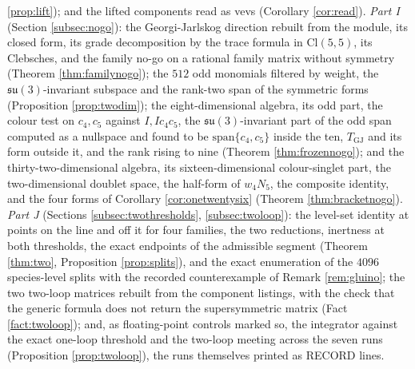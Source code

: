\documentclass[11pt]{article}
\theoremstyle{definition}
\newcommand{\Cl}{\mathrm{Cl}}
\newcommand{\su}{\mathfrak{su}}
\begin{document}
\ref{prop:lift}); and the lifted components read as vevs (Corollary \ref{cor:read}). \emph{Part I} (Section \ref{subsec:nogo}): the Georgi-Jarlskog direction rebuilt from the module, its closed form, its grade decomposition by the trace formula in $\Cl(5,5)$, its Clebsches, and the family no-go on a rational family matrix without symmetry (Theorem \ref{thm:familynogo}); the $512$ odd monomials filtered by weight, the $\su(3)$-invariant subspace and the rank-two span of the symmetric forms (Proposition \ref{prop:twodim}); the eight-dimensional algebra, its odd part, the colour test on $c_{4}, c_{5}$ against $I, Ic_{4}c_{5}$, the $\su(3)$-invariant part of the odd span computed as a nullspace and found to be $\mathrm{span}\{c_{4}, c_{5}\}$ inside the ten, $T_{\mathrm{GJ}}$ and its form outside it, and the rank rising to nine (Theorem \ref{thm:frozennogo}); and the thirty-two-dimensional algebra, its sixteen-dimensional colour-singlet part, the two-dimensional doublet space, the half-form of $w_{4}N_{5}$, the composite identity, and the four forms of Corollary \ref{cor:onetwentysix} (Theorem \ref{thm:bracketnogo}). \emph{Part J} (Sections \ref{subsec:twothresholds}, \ref{subsec:twoloop}): the level-set identity at points on the line and off it for four families, the two reductions, inertness at both thresholds, the exact endpoints of the admissible segment (Theorem \ref{thm:two}, Proposition \ref{prop:splits}), and the exact enumeration of the $4096$ species-level splits with the recorded counterexample of Remark \ref{rem:gluino}; the two two-loop matrices rebuilt from the component listings, with the check that the generic formula does not return the supersymmetric matrix (Fact \ref{fact:twoloop}); and, as floating-point controls marked so, the integrator against the exact one-loop threshold and the two-loop meeting across the seven runs (Proposition \ref{prop:twoloop}), the runs themselves printed as RECORD lines.
\end{document}
